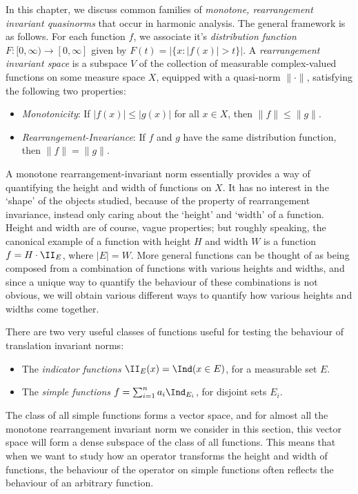 In this chapter, we discuss common families of \emph{monotone, rearrangement invariant quasinorms} that occur in harmonic analysis. The general framework is as follows. For each function $f$, we associate it's \emph{distribution function} $F: [0,\infty) \to [0,\infty]$ given by $F(t) = |\{ x : |f(x)| > t \}|$. A \emph{rearrangement invariant space} is a subspace $V$ of the collection of measurable complex-valued functions on some measure space $X$, equipped with a quasi-norm $\| \cdot \|$, satisfying the following two properties:
%
\begin{itemize}
    \item \emph{Monotonicity}: If $|f(x)| \leq |g(x)|$ for all $x \in X$, then $\| f \| \leq \| g \|$.

    \item \emph{Rearrangement-Invariance}: If $f$ and $g$ have the same distribution function, then $\| f \| = \| g \|$.
\end{itemize}
%
A monotone rearrangement-invariant norm essentially provides a way of quantifying the height and width of functions on $X$. It has no interest in the `shape' of the objects studied, because of the property of rearrangement invariance, instead only caring about the `height' and `width' of a function. Height and width are of course, vague properties; but roughly speaking, the canonical example of a function with height $H$ and width $W$ is a function $f = H \cdot \II_E$, where $|E| = W$. More general functions can be thought of as being composed from a combination of  functions with various heights and widths, and since a unique way to quantify the behaviour of these combinations is not obvious, we will obtain various different ways to quantify how various heights and widths come together.

There are two very useful classes of functions useful for testing the behaviour of translation invariant norms:
%
\begin{itemize}
    \item The \emph{indicator functions} $\II_E(x) = \Ind(x \in E)$, for a measurable set $E$.
    \item The \emph{simple functions} $f = \sum_{i = 1}^n a_i \Ind_{E_i}$, for disjoint sets $E_i$.
\end{itemize}
%
The class of all simple functions forms a vector space, and for almost all the monotone rearrangement invariant norm we consider in this section, this vector space will form a dense subspace of the class of all functions. This means that when we want to study how an operator transforms the height and width of functions, the behaviour of the operator on simple functions often reflects the behaviour of an arbitrary function.

